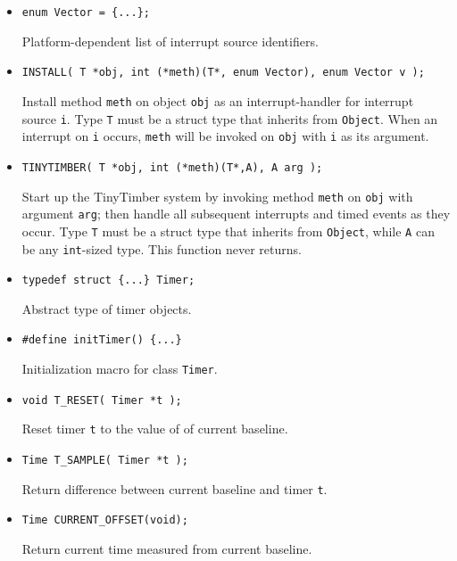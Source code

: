 \documentclass[12pt]{article}
\begin{document}
\begin{itemize}
\item {\tt enum Vector = \{...\};}

Platform-dependent list of interrupt source identifiers.

\item {\tt INSTALL( T *obj, int (*meth)(T*, enum Vector), enum Vector v );}

Install method {\tt meth} on object {\tt obj} as an interrupt-handler for interrupt source {\tt i}. Type {\tt T} must be a struct type that inherits
from {\tt Object}. When an interrupt on {\tt i} occurs, {\tt meth} will be invoked on {\tt obj} with {\tt i} as its argument. 

\item {\tt TINYTIMBER( T *obj, int (*meth)(T*,A), A arg );}

Start up the TinyTimber system by invoking method {\tt meth} on {\tt obj} with argument {\tt arg}; then handle all subsequent interrupts and timed
events as they occur. Type {\tt T} must be a struct type that inherits from {\tt Object}, while {\tt A} can be any {\tt int}-sized type. This function never
returns.

\item {\tt typedef struct \{...\} Timer;}

Abstract type of timer objects.

\item {\tt \#define initTimer() \{...\}}

Initialization macro for class {\tt Timer}.

\item {\tt void T\_RESET( Timer *t );}

Reset timer {\tt t} to the value of of current baseline.

\item {\tt Time T\_SAMPLE( Timer *t );}

Return difference between current baseline and timer {\tt t}.

\item {\tt Time CURRENT\_OFFSET(void);}

Return current time measured from current baseline.

\end{itemize}
\end{document}
